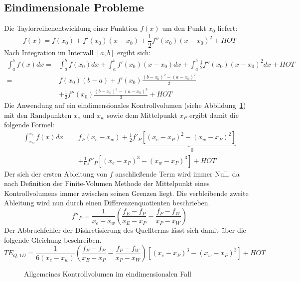 \subsection{Eindimensionale Probleme}
\label{sec:source1d}
Die Taylorreihenentwicklung einer Funktion $f(x)$ um den Punkt $x_0$
liefert:
\begin{equation*}
  f(x) = f(x_0) + f'(x_0)(x-x_0) + \frac{1}{2} f''(x_0)(x-x_0)^2 + HOT
\end{equation*}
Nach Integration im Intervall $[a, b]$ ergibt sich:
\begin{align*}
  \int_a^b f(x) dx =& \int_a^b f(x_0) dx + \int_a^b f'(x_0)(x-x_0) dx
+ \int_a^b \frac{1}{2} f''(x_0)(x-x_0)^2 dx + HOT\\
=& f(x_0) (b-a) + f'(x_0) \frac{(b-x_0)^2-(a-x_0)^2}{2}\\
 &+ \frac{1}{2} f''(x_0) \frac{(b-x_0)^3-(a-x_0)^3}{3} +HOT
\end{align*}
Die Anwendung auf ein eindimensionales Kontrollvolumen (siehe Abbildung~\ref{fig:kv1d}) mit den Randpunkten $x_e$ und
$x_w$ sowie dem Mittelpunkt $x_P$ ergibt damit die folgende Formel:
\begin{align*}
  \int_{x_w}^{x_e} f(x)dx =& f_P(x_e-x_w)
  + \frac{1}{2} f'_P \underbrace{\left[{(x_e-x_P)^2-(x_w-x_P)^2}\right]}_{=0}\\
  &+ \frac{1}{6} f''_P \left[{{(x_e-x_P)}^3-{(x_w-x_P)}^3}\right] + HOT
\end{align*}
Der sich der ersten Ableitung von $f$ anschließende Term wird immer Null, da nach
Definition der Finite-Volumen Methode der Mittelpunkt eines Kontrollvolumens immer
zwischen seinen Grenzen liegt.
Die verbleibende zweite Ableitung wird nun durch einen Differenzenquotienten
beschrieben.
\begin{equation}
  \label{eq:diskretisierung_f''P}
  f''_P = \frac{1}{x_e-x_w}\left(\frac{f_E-f_P}{x_E-x_P}-\frac{f_P-f_W}{x_P-x_W}\right)
\end{equation}
Der Abbruchfehler der Diskretisierung des Quellterms lässt sich damit über die
folgende Gleichung beschreiben.
\begin{equation}
  TE_{Q,1D} =
\frac{1}{6(x_e-x_w)}\left(\frac{f_E-f_P}{x_E-x_P}-\frac{f_P-f_W}{x_P-x_W}\right)
\left[{{(x_e-x_P)}^3-{(x_w-x_P)}^3}\right] + HOT\label{eq:te_source1}
\end{equation}

\begin{figure}[bt]

\centering
\caption{Allgemeines Kontrollvolumen im eindimensionalen Fall}
\label{fig:kv1d}
\end{figure}

